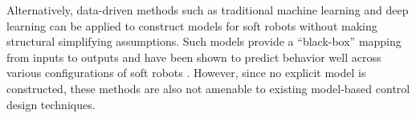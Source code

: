 Alternatively, data-driven methods such as traditional machine learning and deep learning can be applied to construct models for soft robots without making structural simplifying assumptions.
Such models provide a ``black-box'' mapping from inputs to outputs and have been shown to predict behavior well across various configurations of soft robots \cite{gillespie2018learning, thuruthel2018model}.
However, since no explicit model is constructed, these methods are also not amenable to existing model-based control design techniques.


